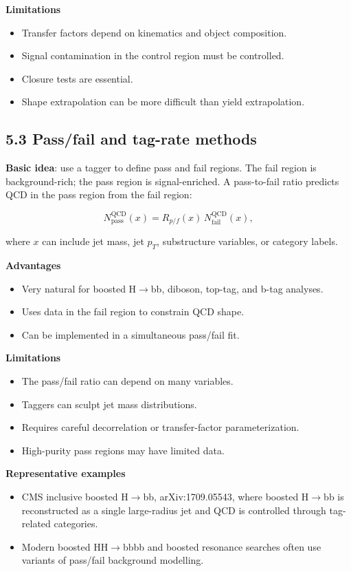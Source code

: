 \documentclass[11pt]{article}
\begin{document}
\textbf{Limitations}

\begin{itemize}
\item Transfer factors depend on kinematics and object composition.
\item Signal contamination in the control region must be controlled.
\item Closure tests are essential.
\item Shape extrapolation can be more difficult than yield extrapolation.
\end{itemize}

\subsection{5.3 Pass/fail and tag-rate methods}

\textbf{Basic idea}: use a tagger to define pass and fail regions. The fail region is background-rich; the pass region is signal-enriched. A pass-to-fail ratio predicts QCD in the pass region from the fail region:

\[
N_{\mathrm{pass}}^{\mathrm{QCD}}(x) = R_{p/f}(x)\,N_{\mathrm{fail}}^{\mathrm{QCD}}(x),
\]

where \(x\) can include jet mass, jet \(p_T\), substructure variables, or category labels.

\textbf{Advantages}

\begin{itemize}
\item Very natural for boosted H$\to$bb, diboson, top-tag, and b-tag analyses.
\item Uses data in the fail region to constrain QCD shape.
\item Can be implemented in a simultaneous pass/fail fit.
\end{itemize}

\textbf{Limitations}

\begin{itemize}
\item The pass/fail ratio can depend on many variables.
\item Taggers can sculpt jet mass distributions.
\item Requires careful decorrelation or transfer-factor parameterization.
\item High-purity pass regions may have limited data.
\end{itemize}

\textbf{Representative examples}

\begin{itemize}
\item CMS inclusive boosted H$\to$bb, arXiv:1709.05543, where boosted H$\to$bb is reconstructed as a single large-radius jet and QCD is controlled through tag-related categories.
\item Modern boosted HH$\to$bbbb and boosted resonance searches often use variants of pass/fail background modelling.
\end{itemize}
\end{document}

